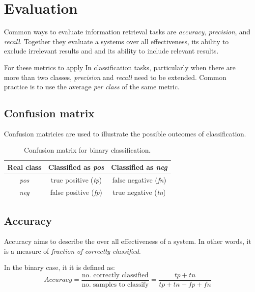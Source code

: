 \documentclass[a4paper,11pt]{kth-mag}
\begin{document}
\section{Evaluation}  %
\label{sec:precision_recall}
Common ways to evaluate information retrieval tasks are \emph{accuracy},
\emph{precision}, and \emph{recall}.
Together they evaluate a systems over all effectiveness,
its ability to exclude irrelevant results and 
and its ability to include relevant results.

For these metrics to apply In classification tasks, particularly when there are more
than two classes, \emph{precision} and \emph{recall} need to be extended. Common practice
is to use the average \emph{per class} of the same metric.


\subsection{Confusion matrix}
Confusion matricies are used to illustrate the possible outcomes of classification.

\begin{table}[h]
  \centering
  \begin{tabular}{| c | c | c |}

    \hline
    Real class & Classified as \emph{pos} & Classified as \emph{neg} \\ \hline
    \emph{pos} & true positive (\emph{tp}) & false negative (\emph{fn}) \\\hline
    \emph{neg} & false positive (\emph{fp}) & true negative (\emph{tn}) \\\hline
  \end{tabular}
  \caption{Confusion matrix for binary classification.}
  \label{todo}
\end{table}



\subsection{Accuracy}
Accuracy aims to describe the over all effectiveness of a system.
In other words, it is a measure of \emph{fraction of correctly classified}.

In the binary case, it it is defined as\cite{sokolova2009systematic}:
\begin{equation} \label{eq:accuracy}
  Accuracy = \frac{\text{no. correctly classified}}{\text{no. samples to classify}} =
  \frac{tp + tn}{tp+tn+fp+fn}
\end{equation}
\end{document}

